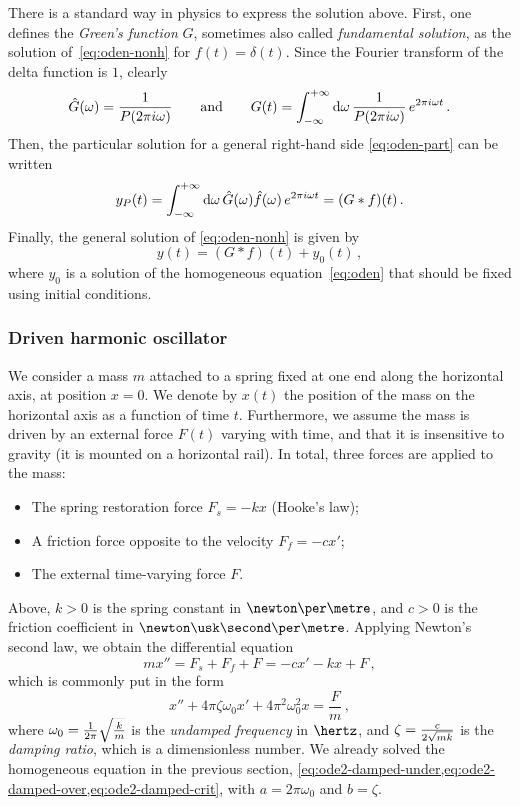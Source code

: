 There is a standard way in physics to express the solution above. First, one defines the
\emph{Green's function} $G$, sometimes also called \emph{fundamental solution}, as the
solution of~\cref{eq:oden-nonh} for $f(t)=\delta(t)$. Since the Fourier transform of the
delta function is $1$, clearly
\begin{equation}
  \hat{G}(\omega)=\frac{1}{P(2\pi i\omega)}\qquad\text{and}\qquad
  G(t)=\int_{-\infty}^{+\infty}\mathrm{d}{\omega}\,\frac{1}{P(2\pi i\omega)}\,e^{2\pi i \omega t}\,.
  \label{eq:green-ft}
\end{equation}
Then, the particular solution for a general right-hand side \cref{eq:oden-part} can be
written
\begin{equation}
  \label{eq:oden-part-conv}
  y_P(t)=\int_{-\infty}^{+\infty}\mathrm{d}{\omega}\,\hat{G}(\omega)\hat{f}(\omega)\,e^{2\pi i\omega t}
  =(G\ast f)(t)\,.
\end{equation}
Finally, the general solution of \cref{eq:oden-nonh} is given by
\begin{equation}
  y(t)=(G\ast f)(t)+y_0(t)\,,
\end{equation}
where $y_0$ is a solution of the homogeneous equation~\cref{eq:oden} that should be fixed
using initial conditions.
\subsubsection{Driven harmonic oscillator}
We consider a mass $m$ attached to a spring fixed at one end along the horizontal axis, at
position $x=0$. We denote by $x(t)$ the position of the mass on the horizontal axis as a
function of time $t$. Furthermore, we assume the mass is driven by an external force
$F(t)$ varying with time, and that it is insensitive to gravity (\eg it is mounted on a
horizontal rail). In total, three forces are applied to the mass:
\begin{itemize}
  \item The spring restoration force $F_s=-kx$ (Hooke's law);
  \item A friction force opposite to the velocity $F_f=-cx'$;
  \item The external time-varying force $F$.
\end{itemize}
Above, $k>0$ is the spring constant in $\newton\per\metre$, and $c>0$ is the friction
coefficient in $\newton\usk\second\per\metre$. Applying Newton's second law, we obtain the
differential equation
\begin{equation}
  mx''=F_s+F_f+F=-cx'-kx+F\,,
\end{equation}
which is commonly put in the form
\begin{equation}
  x''+4\pi\zeta\omega_0x'+4\pi^2\omega_0^2x=\frac{F}{m}\,,\label{eq:ode2-driven}
\end{equation}
where $\omega_0=\smash{\frac{1}{2\pi}\sqrt{\frac{k}{m}}}$ is the \emph{undamped frequency}
in $\hertz$, and $\zeta=\smash{\frac{c}{2\sqrt{mk}}}$ is the \emph{damping ratio}, which
is a dimensionless number. We already solved the homogeneous equation in the previous
section, \cf\cref{eq:ode2-damped-under,eq:ode2-damped-over,eq:ode2-damped-crit}, with
$a=2\pi\omega_0$ and $b=\zeta$.

